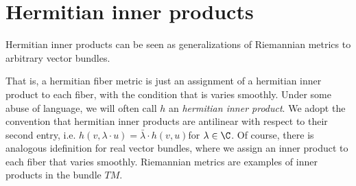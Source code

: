 
\section{Hermitian inner products}
Hermitian inner products can be seen as generalizations of Riemannian metrics to arbitrary vector bundles.

That is, a hermitian fiber metric is just an assignment of a hermitian inner product to each fiber, with the condition that is varies smoothly. Under some abuse of language, we will often call \(h\) an \textit{hermitian inner product}. We adopt the convention that hermitian inner products are antilinear with respect to their second entry, i.e. \(h(v, \lambda \cdot u)= \bar{\lambda} \cdot h(v,u)\)for \(\lambda \in \C\). Of course, there is analogous idefinition for real vector bundles, where we assign an inner product to each fiber that varies smoothly. Riemannian metrics are examples of inner products in the bundle \(TM\). 

